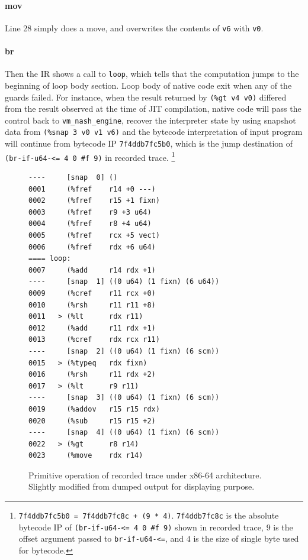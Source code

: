 \documentclass[preprint, 10pt]{sigplanconf}
\begin{document}
\paragraph{mov} Line 28 simply does a move, and overwrites the contents of
\texttt{v6} with \texttt{v0}.

\paragraph{br} Then the IR shows a call to \texttt{loop}, which tells that the
computation jumps to the beginning of loop body section. Loop body of native
code exit when any of the guards failed.  For instance, when the result returned
by \texttt{(\%gt~v4~v0)} differed from the result observed at the time of JIT
compilation, native code will pass the control back to
\texttt{vm\_nash\_engine}, recover the interpreter state by using snapshot data
from \texttt{(\%snap~3~v0~v1~v6)} and the bytecode interpretation of input
program will continue from bytecode IP \texttt{7f4ddb7fc5b0}, which is the jump
destination of \texttt{(br-if-u64-<=~4~0~\#f~9)} in recorded trace.
\footnote{ \texttt{7f4ddb7fc5b0 = 7f4ddb7fc8c + (9 * 4)}.  \texttt{7f4ddb7fc8c}
  is the absolute bytecode IP of \texttt{(br-if-u64-<= 4 0 \#f 9)} shown in
  recorded trace, $9$ is the offset argument passed to \texttt{br-if-u64-<=},
  and $4$ is the size of single byte used for bytecode.}

\begin{figure}
  \centering
  \small
\begin{verbatim}
----     [snap  0] ()
0001     (%fref    r14 +0 ---)
0002     (%fref    r15 +1 fixn)
0003     (%fref    r9 +3 u64)
0004     (%fref    r8 +4 u64)
0005     (%fref    rcx +5 vect)
0006     (%fref    rdx +6 u64)
==== loop:
0007     (%add     r14 rdx +1)
----     [snap  1] ((0 u64) (1 fixn) (6 u64))
0009     (%cref    r11 rcx +0)
0010     (%rsh     r11 r11 +8)
0011   > (%lt      rdx r11)
0012     (%add     r11 rdx +1)
0013     (%cref    rdx rcx r11)
----     [snap  2] ((0 u64) (1 fixn) (6 scm))
0015   > (%typeq   rdx fixn)
0016     (%rsh     r11 rdx +2)
0017   > (%lt      r9 r11)
----     [snap  3] ((0 u64) (1 fixn) (6 scm))
0019     (%addov   r15 r15 rdx)
0020     (%sub     r15 r15 +2)
----     [snap  4] ((0 u64) (1 fixn) (6 scm))
0022   > (%gt      r8 r14)
0023     (%move    rdx r14)
\end{verbatim}
\caption{Primitive operation of recorded trace under x86-64
  architecture. Slightly modified from dumped output for displaying purpose.}
\label{fig:primops}
\end{figure}
\end{document}
